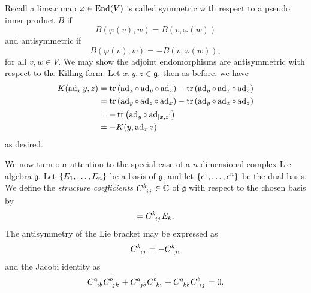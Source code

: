 Recall a linear map \(\varphi \in \operatorname{End}(V)\) is called symmetric with respect to a pseudo inner product \(B\) if
\begin{equation*}
    B(\varphi(v), w) = B(v, \varphi(w))
\end{equation*}
and antisymmetric if
\begin{equation*}
    B(\varphi(v), w) = -B(v, \varphi(w)),
\end{equation*}
for all \(v, w \in V\). We may show the adjoint endomorphisms are antisymmetric with respect to the Killing form. Let \(x, y, z \in \mathfrak{g}\), then as before, we have
\begin{align*}
    K(\operatorname{ad}_{x}y, z) &= \operatorname{tr}\left(\operatorname{ad}_{x}\circ\operatorname{ad}_{y}\circ\operatorname{ad}_{z}\right) - \operatorname{tr}\left(\operatorname{ad}_{y}\circ\operatorname{ad}_{x}\circ\operatorname{ad}_{z}\right)\\
                  &= \operatorname{tr}\left(\operatorname{ad}_{y}\circ\operatorname{ad}_{z}\circ\operatorname{ad}_{x}\right) - \operatorname{tr}\left(\operatorname{ad}_{y}\circ\operatorname{ad}_{x}\circ\operatorname{ad}_{z}\right)\\
                  &= -\operatorname{tr}\left(\operatorname{ad}_{y}\circ\operatorname{ad}_{[x,z]}\right)\\
                  &= -K(y, \operatorname{ad}_{x}z)
\end{align*}
as desired.

We now turn our attention to the special case of a \(n\)-dimensional complex Lie algebra \(\mathfrak{g}\). Let \(\{E_1, \dots, E_n\}\) be a basis of \(\mathfrak{g}\), and let \(\{\epsilon^1, \dots, \epsilon^n\}\) be the dual basis. We define the \emph{structure coefficients \(C\indices{^k_{ij}} \in \mathbb{C}\)} of \(\mathfrak{g}\) with respect to the chosen basis by
\begin{equation*}
    [E_i, E_j] = C\indices{^k_{ij}}E_k.
\end{equation*}
The antisymmetry of the Lie bracket may be expressed as
\begin{equation*}
    C\indices{^k_{ij}} = -C\indices{^k_{ji}}
\end{equation*}
and the Jacobi identity as
\begin{equation*}
    C\indices{^a_{ib}}C\indices{^b_{jk}} + C\indices{^a_{jb}}C\indices{^b_{ki}} + C\indices{^a_{kb}}C\indices{^b_{ij}} = 0.
\end{equation*}

